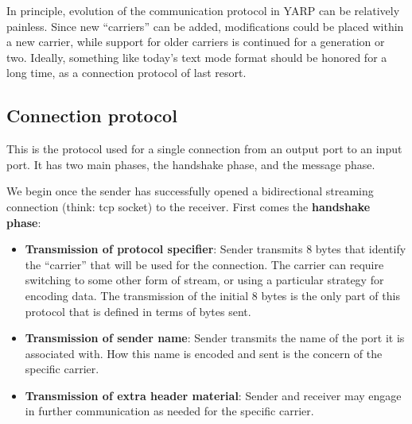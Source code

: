 



In principle, evolution of the communication protocol in YARP can be
relatively painless.  Since new ``carriers'' can be added,
modifications could be placed within a new carrier, while support for
older carriers is continued for a generation or two.  Ideally,
something like today's text mode format should be honored for a long
time, as a connection protocol of last resort.



\subsection{Connection protocol}

This is the protocol used for a single connection from an output port
to an input port. It has two main phases, the handshake phase,
and the message phase.

We begin once the sender has successfully opened a bidirectional
streaming connection (think: tcp socket) to the receiver.
First comes the {\bf handshake phase}:

\begin{itemize} \pflist

\item {\bf Transmission of protocol specifier}:
Sender transmits 8 bytes that identify the ``carrier'' that will be
used for the connection.  The carrier can require switching to 
some other form of stream, or using a particular strategy for
encoding data.  The transmission of the initial 8 bytes is the
only part of this protocol that is defined in terms of bytes sent.

\item {\bf Transmission of sender name}: Sender transmits the name of
the port it is associated with.  How this name is encoded and sent is
the concern of the specific carrier.

\item {\bf Transmission of extra header material}: Sender and
receiver may engage in further communication as needed for the
specific carrier.  

\end{itemize}

